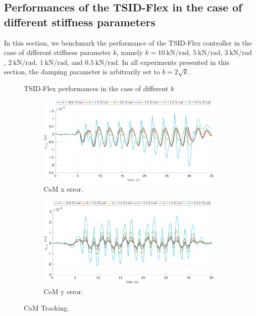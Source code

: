\subsection{Performances of the TSID-Flex in the case of different stiffness parameters}

In this section, we benchmark the performance of the TSID-Flex controller in the case of different stiffness parameter $k$, namely $k= \SI{10}{\kilo \newton\per\radian}$, $\SI{5}{\kilo \newton\per\radian}$, $\SI{3}{\kilo \newton\per\radian}$, $\SI{2}{\kilo \newton\per\radian}$, $\SI{1}{\kilo \newton\per\radian}$, and $\SI{0.5}{\kilo \newton\per\radian}$.  In all experiments presented in this section, the damping parameter is arbitrarily set to $b=2\sqrt{k}$.

\begin{figure}[t]
    \begin{myframe}{TSID-Flex performances in the case of different $k$}
    \centering
        \begin{subfigure}[b]{0.8\textwidth}
        \centering
        \includegraphics[width=\columnwidth]{chapter_flexible_joints/figures/estimation_com_x_flex.pdf}
        \caption{CoM x error.\label{fig:estimation_com_x_flex}}
    \end{subfigure}
    \hfill
    \begin{subfigure}[b]{0.8\textwidth}
        \centering
        \includegraphics[width=\columnwidth]{chapter_flexible_joints/figures/estimation_com_y_flex.pdf}
        \caption{CoM y error.\label{fig:estimation_com_y_flex}}
    \end{subfigure}
    \end{myframe}
    \caption{CoM Tracking.\label{fig:estimation_com_flex}}
\end{figure}
